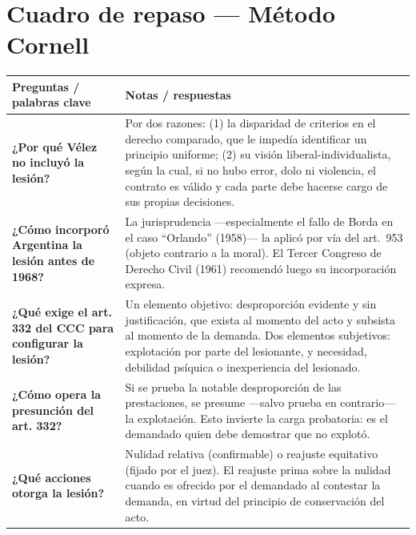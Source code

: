 \documentclass[12pt,oneside]{book}
\begin{document}
\section*{Cuadro de repaso — Método Cornell}

\begin{longtable}{
    >{\raggedright\arraybackslash}p{}
    >{\raggedright\arraybackslash}p{}
}
\toprule
\textbf{Preguntas / palabras clave} & \textbf{Notas / respuestas} \\
\midrule
\endhead

\textbf{¿Por qué Vélez no incluyó la lesión?} &
Por dos razones: (1) la disparidad de criterios en el derecho comparado, que le impedía identificar un principio uniforme; (2) su visión liberal-individualista, según la cual, si no hubo error, dolo ni violencia, el contrato es válido y cada parte debe hacerse cargo de sus propias decisiones. \\

\textbf{¿Cómo incorporó Argentina la lesión antes de 1968?} &
La jurisprudencia —especialmente el fallo de Borda en el caso ``Orlando'' (1958)— la aplicó por vía del art.\ 953 (objeto contrario a la moral). El Tercer Congreso de Derecho Civil (1961) recomendó luego su incorporación expresa. \\

\textbf{¿Qué exige el art. 332 del CCC para configurar la lesión?} &
Un elemento objetivo: desproporción evidente y sin justificación, que exista al momento del acto y subsista al momento de la demanda. Dos elementos subjetivos: explotación por parte del lesionante, y necesidad, debilidad psíquica o inexperiencia del lesionado. \\

\textbf{¿Cómo opera la presunción del art. 332?} &
Si se prueba la notable desproporción de las prestaciones, se presume —salvo prueba en contrario— la explotación. Esto invierte la carga probatoria: es el demandado quien debe demostrar que no explotó. \\

\textbf{¿Qué acciones otorga la lesión?} &
Nulidad relativa (confirmable) o reajuste equitativo (fijado por el juez). El reajuste prima sobre la nulidad cuando es ofrecido por el demandado al contestar la demanda, en virtud del principio de conservación del acto. \\


\end{longtable}
\end{document}
